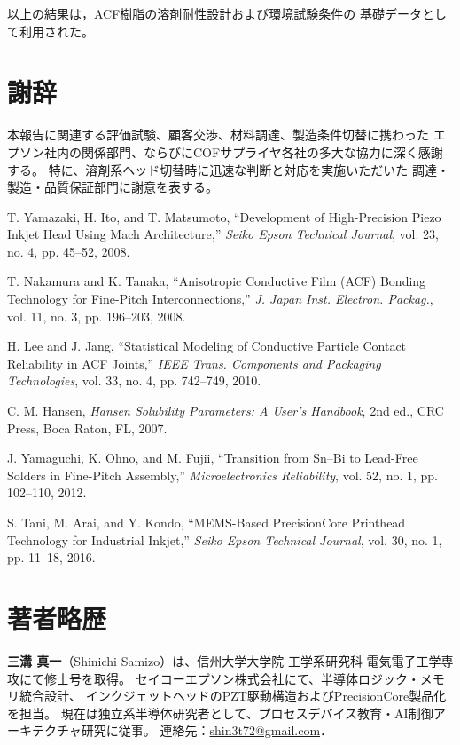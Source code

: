 \documentclass[conference]{IEEEtran}
\begin{document}
以上の結果は，ACF樹脂の溶剤耐性設計および環境試験条件の
基礎データとして利用された。

\section*{謝辞}

本報告に関連する評価試験、顧客交渉、材料調達、製造条件切替に携わった  
エプソン社内の関係部門、ならびにCOFサプライヤ各社の多大な協力に深く感謝する。  
特に、溶剤系ヘッド切替時に迅速な判断と対応を実施いただいた  
調達・製造・品質保証部門に謝意を表する。

\begin{thebibliography}{99}

T. Yamazaki, H. Ito, and T. Matsumoto,
``Development of High-Precision Piezo Inkjet Head Using Mach Architecture,''
\textit{Seiko Epson Technical Journal}, vol. 23, no. 4, pp. 45–52, 2008.

T. Nakamura and K. Tanaka,
``Anisotropic Conductive Film (ACF) Bonding Technology for Fine-Pitch Interconnections,''
\textit{J. Japan Inst. Electron. Packag.}, vol. 11, no. 3, pp. 196–203, 2008.

H. Lee and J. Jang,
``Statistical Modeling of Conductive Particle Contact Reliability in ACF Joints,''
\textit{IEEE Trans. Components and Packaging Technologies}, vol. 33, no. 4, pp. 742–749, 2010.

C. M. Hansen,
\textit{Hansen Solubility Parameters: A User’s Handbook}, 2nd ed.,
CRC Press, Boca Raton, FL, 2007.

J. Yamaguchi, K. Ohno, and M. Fujii,
``Transition from Sn–Bi to Lead-Free Solders in Fine-Pitch Assembly,''
\textit{Microelectronics Reliability}, vol. 52, no. 1, pp. 102–110, 2012.

S. Tani, M. Arai, and Y. Kondo,
``MEMS-Based PrecisionCore Printhead Technology for Industrial Inkjet,'' 
\textit{Seiko Epson Technical Journal}, vol. 30, no. 1, pp. 11–18, 2016.

\end{thebibliography}

\section*{著者略歴}

\textbf{三溝 真一}（Shinichi Samizo）は、信州大学大学院 工学系研究科 電気電子工学専攻にて修士号を取得。  
セイコーエプソン株式会社にて、半導体ロジック・メモリ統合設計、  
インクジェットヘッドのPZT駆動構造およびPrecisionCore製品化を担当。  
現在は独立系半導体研究者として、プロセスデバイス教育・AI制御アーキテクチャ研究に従事。  
連絡先：\href{mailto:shin3t72@gmail.com}{shin3t72@gmail.com}．

\balance %
\end{document}

